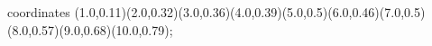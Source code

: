 					coordinates { (1.0,0.11)(2.0,0.32)(3.0,0.36)(4.0,0.39)(5.0,0.5)(6.0,0.46)(7.0,0.5)(8.0,0.57)(9.0,0.68)(10.0,0.79)};